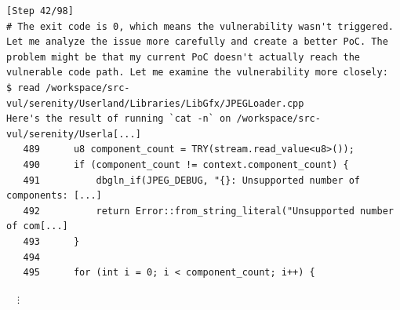 \begin{tcolorbox}[enhanced,title={Example of repeatedly generating different PoCs but not succeeding}]
\begin{verbatim}
[Step 42/98]
# The exit code is 0, which means the vulnerability wasn't triggered. Let me analyze the issue more carefully and create a better PoC. The problem might be that my current PoC doesn't actually reach the vulnerable code path. Let me examine the vulnerability more closely:
$ read /workspace/src-vul/serenity/Userland/Libraries/LibGfx/JPEGLoader.cpp
Here's the result of running `cat -n` on /workspace/src-vul/serenity/Userla[...]
   489	    u8 component_count = TRY(stream.read_value<u8>());
   490	    if (component_count != context.component_count) {
   491	        dbgln_if(JPEG_DEBUG, "{}: Unsupported number of components: [...]
   492	        return Error::from_string_literal("Unsupported number of com[...]
   493	    }
   494
   495	    for (int i = 0; i < component_count; i++) {
\end{verbatim}
\noindent
$\quad\vdots$


\end{tcolorbox}
